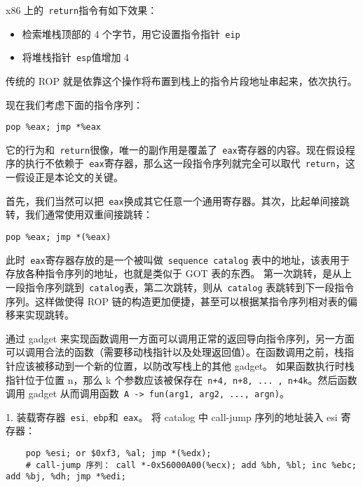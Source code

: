\documentclass{article}
\begin{document}
x86 上的\verb+ return+指令有如下效果：
\begin{itemize}
    \item 检索堆栈顶部的 4 个字节，用它设置指令指针\verb+ eip+
    \item 将堆栈指针\verb+ esp+值增加 4
\end{itemize}

传统的 ROP 就是依靠这个操作将布置到栈上的指令片段地址串起来，依次执行。

现在我们考虑下面的指令序列：
\begin{verbatim}
pop %eax; jmp *%eax
\end{verbatim}

它的行为和\verb+ return+很像，唯一的副作用是覆盖了\verb+ eax+寄存器的内容。现在假设程序的执行不依赖于\verb+ eax+寄存器，那么这一段指令序列就完全可以取代\verb+ return+，这一假设正是本论文的关键。

首先，我们当然可以把\verb+ eax+换成其它任意一个通用寄存器。其次，比起单间接跳转，我们通常使用双重间接跳转：
\begin{verbatim}
pop %eax; jmp *(%eax)
\end{verbatim}

此时\verb+ eax+寄存器存放的是一个被叫做\verb+ sequence catalog+ 表中的地址，该表用于存放各种指令序列的地址，也就是类似于 GOT 表的东西。
第一次跳转，是从上一段指令序列跳到\verb+ catalog+表，第二次跳转，则从\verb+ catalog+ 表跳转到下一段指令序列。这样做使得 ROP 链的构造更加便捷，甚至可以根据某指令序列相对表的偏移来实现跳转。



通过 gadget 来实现函数调用一方面可以调用正常的返回导向指令序列，另一方面可以调用合法的函数（需要移动栈指针以及处理返回值）。在函数调用之前，栈指针应该被移动到一个新的位置，以防改写栈上的其他 gadget。
如果函数执行时栈指针位于位置 n，那么 k 个参数应该被保存在\verb| n+4, n+8, ... , n+4k|。然后函数调用 gadget 从而调用函数\verb| A -> fun(arg1, arg2, ..., argn)|。

1. 装载寄存器\verb+ esi+,\verb+ ebp+和\verb+ eax+。
将 catalog 中 call-jump 序列的地址装入 esi 寄存器：
\begin{verbatim}
    pop %esi; or $0xf3, %al; jmp *(%edx);
    # call-jump 序列： call *-0x56000A00(%ecx); add %bh, %bl; inc %ebc; add %bj, %dh; jmp *%edi;
\end{verbatim}
    
\end{document}
